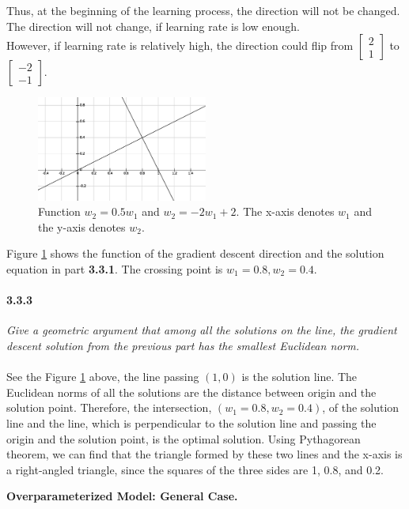 \documentclass{myhw}
\begin{document}
\begin{homeworkProblem}
\begin{homeworkSection}
\begin{gather*}
\begin{aligned}
\end{aligned}
\end{gather*}
Thus, at the beginning of the learning process, the direction will not be changed.
The direction will not change, if learning rate is low enough. \\
However, if learning rate is relatively high, the direction could flip from $\begin{bmatrix} 2 \\ 1 \end{bmatrix}$ to $\begin{bmatrix} -2 \\ -1 \end{bmatrix}$.

\begin{figure}[ht]
  \centering
  \includegraphics[width=0.5\textwidth]{a3.eps} 
  \caption{Function $w_2 = 0.5 w_1$ and $w_2 = -2 w_1 + 2$. The x-axis denotes $w_1$ and the y-axis denotes $w_2$.}
  \label{fig:q3.3}
\end{figure}
Figure \ref{fig:q3.3} shows the function of the gradient descent direction and the solution equation in part \textbf{3.3.1}. The crossing point is $w_1 = 0.8, w_2 = 0.4$.
\paragraph{3.3.3} \emph{Give a geometric argument that among all the solutions on the line, the gradient descent solution from the previous part has the smallest Euclidean norm.} \\
\\
See the Figure \ref{fig:q3.3} above, the line passing $(1, 0)$ is the solution line. The Euclidean norms of all the solutions are the distance between origin and the solution point. Therefore, the intersection, $(w_1 = 0.8, w_2=0.4)$, of the solution line and the line, which is perpendicular to the solution line and passing the origin and the solution point, is the optimal solution. Using Pythagorean theorem, we can find that the triangle formed by these two lines and the x-axis is a right-angled triangle, since the squares of the three sides are 1, 0.8, and 0.2.
\end{homeworkSection}
\begin{homeworkSection}
\textbf{Overparameterized Model: General Case.}

\end{homeworkSection}
\end{homeworkProblem}
\end{document}
